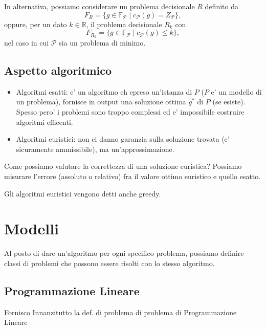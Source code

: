 In alternativa, possiamo considerare un problema decisionale $R$ definito da
\[
F_R = \{ g \in \mathbb{F}_\mathcal{P} \mid c_\mathcal{P}(g) = Z_\mathcal{P} \},
\]
oppure, per un dato $k \in \mathbb{R}$, il problema decisionale $R_k$ con
\[
F_{R_k} = \{ g \in \mathbb{F}_\mathcal{P} \mid c_\mathcal{P}(g) \le k \},
\]
nel caso in cui $\mathcal{P}$ sia un problema di minimo.

\subsection{Aspetto algoritmico}
\begin{itemize}
  \item Algoritmi esatti: e' un algoritmo ch epreso un'istanza di $ P $ ($ P $ e' un modello di un problema), fornisce in output una soluzione ottima $ g^* $ di $ P $ (se esiste). Spesso pero' i problemi sono troppo complessi ed e' impossibile costruire algoritmi efficenti.
  \item Algoritmi euristici: non ci danno garanzia sulla soluzione trovata (e' sicuramente ammissibile), ma un'approssimazione.
\end{itemize}

Come possiamo valutare la correttezza di una soluzione euristica? Possiamo misurare l'errore (assoluto o relativo) fra il valore ottimo euristico e quello esatto.

Gli algoritmi euristici vengono detti anche greedy.

\section{Modelli}
Al posto di dare un'algoritmo per ogni specifico problema, possiamo definire classi di problemi che possono essere risolti con lo stesso algoritmo.

\subsection{Programmazione Lineare}

Fornisco Innanzitutto la def. di problema di problema di Programmazione Lineare

